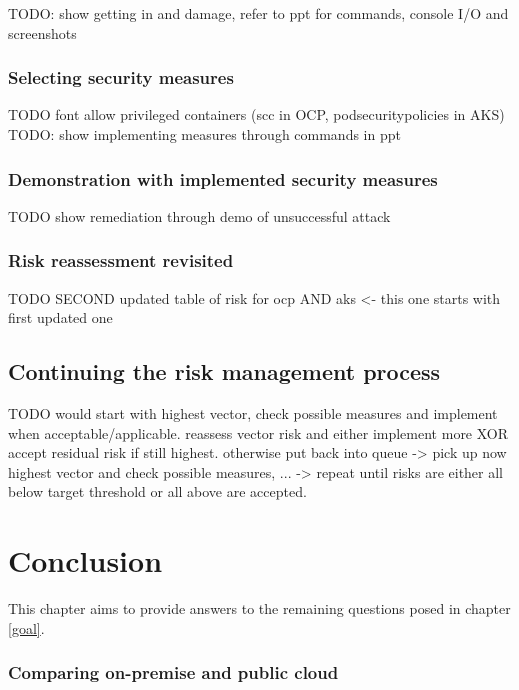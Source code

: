 TODO: show getting in and damage, refer to ppt for commands, console I/O and screenshots

\subsection{Selecting security measures}
TODO font allow privileged containers (scc in OCP, podsecuritypolicies in AKS)
TODO: show implementing measures through commands in ppt

\subsection{Demonstration with implemented security measures}

TODO show remediation through demo of unsuccessful attack

\subsection{Risk reassessment revisited}

TODO SECOND updated table of risk for ocp AND aks <- this one starts with first updated one

\section{Continuing the risk management process}

TODO would start with highest vector, check possible measures and implement when acceptable/applicable. reassess vector risk and either implement more XOR accept residual risk if still highest. otherwise put back into queue -> pick up now highest vector and check possible measures, ... -> repeat until risks are either all below target threshold or all above are accepted.

\chapter{Conclusion}
This chapter aims to provide answers to the remaining questions posed in chapter \ref{goal}.

\subsection{Comparing on-premise and public cloud}

